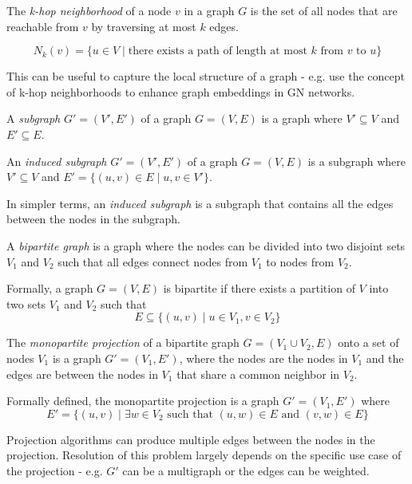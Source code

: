 \begin{definition}
    The \textit{k-hop neighborhood} of a node $v$ in a graph $G$ is the set of all nodes that are reachable from $v$ by traversing at most $k$ edges.

    $$
    N_k(v) = \{ u \in V \mid \text{there exists a path of length at most $k$ from $v$ to $u$} \}
    $$

    This can be useful to capture the local structure of a graph 
    - e.g. \cite{nikolentzos2019khop} use the concept of k-hop neighborhoods to enhance graph embeddings in GN networks.
\end{definition}

\begin{definition}[Subgraph]
    A \textit{subgraph} $G' = (V', E')$ of a graph $G = (V, E)$ is a graph where $V' \subseteq V$ and $E' \subseteq E$.
\end{definition}

\begin{definition}
    An \textit{induced subgraph} $G' = (V', E')$ of a graph $G = (V, E)$ is a subgraph where $V' \subseteq V$ and $E' = \{ (u, v) \in E \mid u, v \in V' \}$.

    In simpler terms, an \textit{induced subgraph} is a subgraph that contains all the edges between the nodes in the subgraph.
\end{definition}

\begin{definition}
    A \textit{bipartite graph} is a graph where the nodes can be divided into two disjoint sets $V_1$ and $V_2$ such that all edges connect nodes from $V_1$ to nodes from $V_2$.
    
    Formally, a graph $G = (V, E)$ is bipartite if there exists a partition of $V$ into two sets $V_1$ and $V_2$ such that
    $$E \subseteq \{ (u, v) \mid u \in V_1, v \in V_2 \}$$
\end{definition}

\begin{definition}\label{def:monopartite-projection}
    The \textit{monopartite projection} of a bipartite graph $G = (V_1 \cup V_2, E)$ onto a set of nodes $V_1$ is a graph $G' = (V_1, E')$, 
    where the nodes are the nodes in $V_1$ and the edges are between the nodes in $V_1$ that share a common neighbor in $V_2$.
    
    Formally defined, the monopartite projection is a graph $G' = (V_1, E')$ where
    $$
    E' = \{ (u, v) \mid \exists w \in V_2 \text{ such that } (u, w) \in E \text{ and } (v, w) \in E \}
    $$

    Projection algorithms can produce multiple edges between the nodes in the projection.
    Resolution of this problem largely depends on the specific use case of the projection - e.g. $G'$ can be a multigraph or the edges can be weighted.
    
\end{definition}
